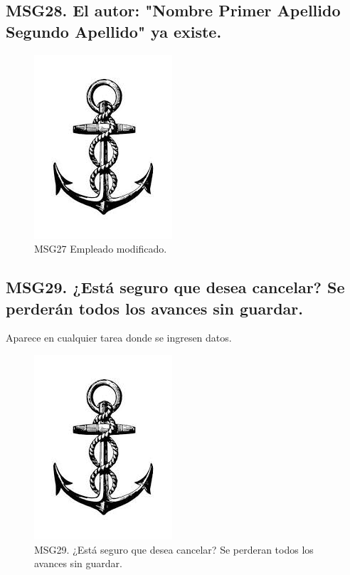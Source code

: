 \subsection{MSG28. El autor: "Nombre Primer Apellido Segundo Apellido" ya existe.}
    \begin{figure}[htbp]
        \begin{center}
            \includegraphics[width=.4\textwidth]{images/MSG/ancla}
            \caption{MSG27 Empleado modificado.}
            \label{fig:MSG27}
        \end{center}
    \end{figure}

    \subsection{MSG29. ¿Está seguro que desea cancelar? Se perderán todos los avances sin guardar.}
     Aparece en cualquier tarea donde se ingresen datos.
        \begin{figure}[htbp]
            \begin{center}
                \includegraphics[width=.4\textwidth]{images/MSG/ancla}
                \caption{MSG29. ¿Está seguro que desea cancelar? Se perderan todos los avances sin guardar.}
                \label{fig:MSG29}
            \end{center}
        \end{figure}

